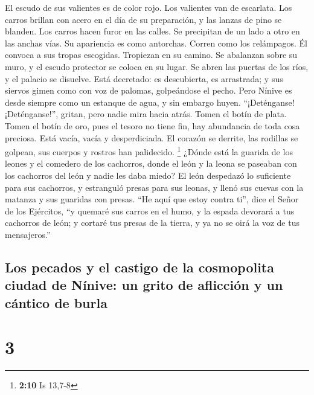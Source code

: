  El escudo de sus valientes es de color rojo. Los
valientes van de escarlata. Los carros brillan con acero en el día de su
preparación, y las lanzas de pino se blanden.  Los carros
hacen furor en las calles. Se precipitan de un lado a otro en las anchas
vías. Su apariencia es como antorchas. Corren como los relámpagos.
 Él convoca a sus tropas escogidas. Tropiezan en su
camino. Se abalanzan sobre su muro, y el escudo protector se coloca en
su lugar.  Se abren las puertas de los ríos, y el palacio
se disuelve.  Está decretado: es descubierta, es
arrastrada; y sus siervos gimen como con voz de palomas, golpeándose el
pecho.  Pero Nínive es desde siempre como un estanque de
agua, y sin embargo huyen. ``¡Deténganse! ¡Deténganse!'', gritan, pero
nadie mira hacia atrás.  Tomen el botín de plata. Tomen el
botín de oro, pues el tesoro no tiene fin, hay abundancia de toda cosa
preciosa.  Está vacía, vacía y desperdiciada. El corazón
se derrite, las rodillas se golpean, sus cuerpos y rostros han
palidecido. \footnote{\textbf{2:10} Is 13,7-8}  ¿Dónde
está la guarida de los leones y el comedero de los cachorros, donde el
león y la leona se paseaban con los cachorros del león y nadie les daba
miedo?  El león despedazó lo suficiente para sus
cachorros, y estranguló presas para sus leonas, y llenó sus cuevas con
la matanza y sus guaridas con presas.  ``He aquí que
estoy contra ti'', dice el Señor de los Ejércitos, ``y quemaré sus
carros en el humo, y la espada devorará a tus cachorros de león; y
cortaré tus presas de la tierra, y ya no se oirá la voz de tus
mensajeros.''

\hypertarget{los-pecados-y-el-castigo-de-la-cosmopolita-ciudad-de-nuxednive-un-grito-de-aflicciuxf3n-y-un-cuxe1ntico-de-burla}{%
\subsection{Los pecados y el castigo de la cosmopolita ciudad de Nínive:
un grito de aflicción y un cántico de
burla}\label{los-pecados-y-el-castigo-de-la-cosmopolita-ciudad-de-nuxednive-un-grito-de-aflicciuxf3n-y-un-cuxe1ntico-de-burla}}

\hypertarget{section-2}{%
\section{3}\label{section-2}}

